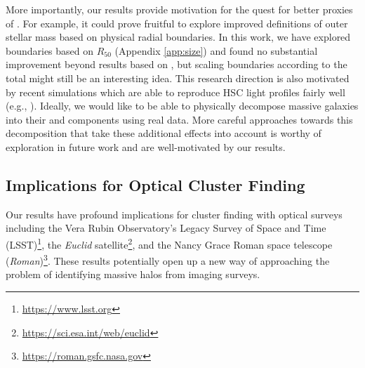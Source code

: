 \documentclass[fleqn,usenatbib,useAMS]{mnras}
\begin{document}
\begin{CJK*}{UTF8}{gbsn}
    More importantly, our results provide motivation for the quest for better proxies of \exsitu{}
    \mstar{}.
    For example, it could prove fruitful to explore improved definitions of outer stellar mass based
    on physical radial boundaries. 
    In this work, we have explored boundaries based on $R_{50}$ (Appendix \ref{app:size}) and found
    no substantial improvement beyond results based on , but scaling boundaries
    according to the total \mstar{} might still be an interesting idea.
    This research direction is also motivated by recent simulations which are able to reproduce HSC
    light profiles fairly well (e.g., \citealt{Ardila2021}). 
    Ideally, we would like to be able to physically decompose massive galaxies into their \insitu{}
    and \exsitu{} components using real data. More careful approaches towards this decomposition
    that take these additional effects into account is worthy of exploration in future work and are
    well-motivated by our results.
    
\subsection{Implications for Optical Cluster Finding}
    \label{sec:perfect_finder}
    
    Our results have profound implications for cluster finding with optical surveys including the
    Vera Rubin Observatory's Legacy Survey of Space and Time
    (LSST)\footnote{\url{https://www.lsst.org}}, the \textit{Euclid}
    satellite\footnote{\url{https://sci.esa.int/web/euclid}}, and the Nancy Grace Roman space
    telescope (\textit{Roman})\footnote{\url{https://roman.gsfc.nasa.gov}}.  
    These results potentially open up a new way of approaching the problem of identifying massive
    halos from imaging surveys.


\end{CJK*}
\end{document}
